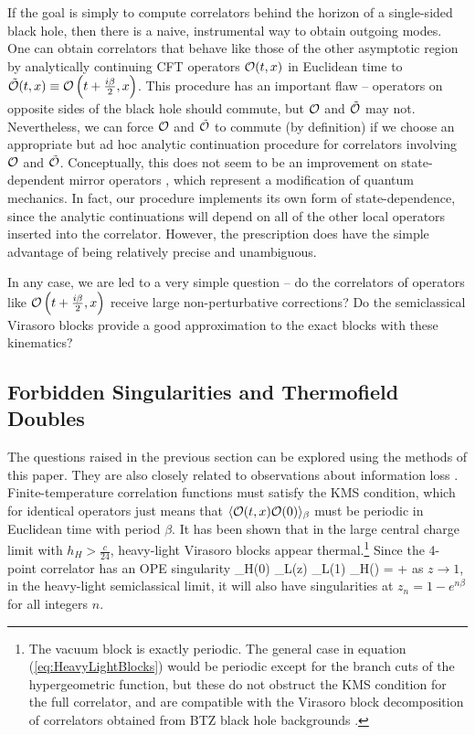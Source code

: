 If the goal is simply to compute correlators behind the horizon of a single-sided black hole, then there is a naive, instrumental way to obtain outgoing modes.  One can obtain correlators that behave like those of the other asymptotic region by analytically continuing \cite{Hamilton:2005ju} CFT operators ${\cal O}(t, x)$ in Euclidean time to $\tilde {{\cal O}}(t, x) \equiv {\cal O} \left(t + \frac{i \beta}{2}, x \right)$.  This procedure has an important flaw -- operators on opposite sides of the black hole should  commute, but ${\cal O}$ and $\tilde {{\cal O}}$ may not. Nevertheless, we can force ${\cal O}$ and $\tilde {{\cal O}}$ to commute (by definition) if we choose an appropriate but ad hoc analytic continuation procedure for correlators involving ${\cal O}$ and $\tilde {{\cal O}}$.  Conceptually, this does not seem to be an improvement on state-dependent mirror operators \cite{Papadodimas:2012aq, Papadodimas:2013jku}, which represent a modification of quantum mechanics.  In fact, our procedure implements its own form of state-dependence, since the analytic continuations will depend on all of the other local operators inserted into the correlator.  However, the prescription does have the simple advantage of being relatively precise and unambiguous.

In any case, we are led to a very simple question -- do the correlators of operators like ${\cal O} \left(t + \frac{i \beta}{2}, x \right)$ receive large non-perturbative corrections?  Do the semiclassical Virasoro blocks provide a good approximation to the exact blocks with these kinematics?  

\subsection{Forbidden Singularities and Thermofield Doubles}

The questions raised in the previous section can be explored using the methods of this paper.  They are also closely related to observations about information loss \cite{Fitzpatrick:2016ive}.  Finite-temperature correlation functions must satisfy the KMS condition, which for identical operators just means that $\langle {\cal O}(t, x) {\cal O}(0) \rangle_\beta$  must be periodic in Euclidean time with period $\beta$.  It has been shown that in the large central charge limit with $h_H > \frac{c}{24}$, heavy-light Virasoro blocks appear thermal.\footnote{The vacuum block is exactly periodic.  The general case in equation (\ref{eq:HeavyLightBlocks}) would be periodic except for the branch cuts of the hypergeometric function, but these do not obstruct the KMS condition for the full correlator, and are compatible with the Virasoro block decomposition of correlators obtained from BTZ black hole backgrounds \cite{Fitzpatrick:2015zha}.}  Since the 4-point correlator has an OPE singularity
\be
\< \CO_H(0) \CO_L(z) \CO_L(1) \CO_H(\infty) \> =  + \cdots
\ee
as $z \to 1$, in the heavy-light semiclassical limit, it will also have singularities at $z_n = 1 - e^{n \beta}$ for all integers $n$.   

